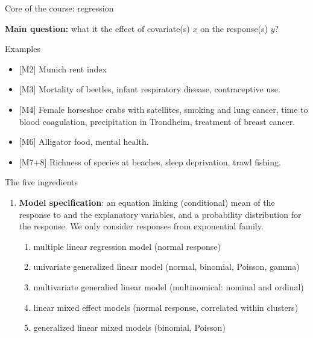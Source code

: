 \documentclass[ignorenonframetext,]{beamer}
\providecommand{\tightlist}{%
  \setlength{\itemsep}{0pt}\setlength{\parskip}{0pt}}
\begin{document}
\begin{frame}{Core of the course: regression}

\textbf{Main question:} what it the effect of covariate(s) \(x\) on the
response(s) \(y\)?

\begin{block}{Examples}

\begin{itemize}
\tightlist
\item
  {[}M2{]} Munich rent index
\item
  {[}M3{]} Mortality of beetles, infant respiratory disease,
  contraceptive use.
\item
  {[}M4{]} Female horseshoe crabs with satellites, smoking and lung cancer, time
  to blood coagulation, precipitation in Trondheim, treatment of breast
  cancer.
\item
  {[}M6{]} Alligator food, mental health.
\item
  {[}M7+8{]} Richness of species at beaches, sleep deprivation, trawl
  fishing.
\end{itemize}

\end{block}

\end{frame}

\begin{frame}

\begin{block}{The five ingredients}

\begin{enumerate}
\def\labelenumi{\arabic{enumi}.}
\tightlist
\item
  \textbf{Model specification}: an equation linking (conditional) mean
  of the response to and the explanatory variables, and a probability
  distribution for the response. We only consider responses from
  exponential family.

  \begin{enumerate}
  \def\labelenumii{\alph{enumii}.}
  \tightlist
  \item
    multiple linear regression model (normal response)
  \item
    univariate generalized linear model (normal, binomial, Poisson,
    gamma)
  \item
    multivariate generalied linear model (multinomical: nominal and
    ordinal)
  \item
    linear mixed effect models (normal response, correlated within
    clusters)
  \item
    generalized linear mixed models (binomial, Poisson)
  \end{enumerate}
\end{enumerate}

\end{block}

\end{frame}
\end{document}
